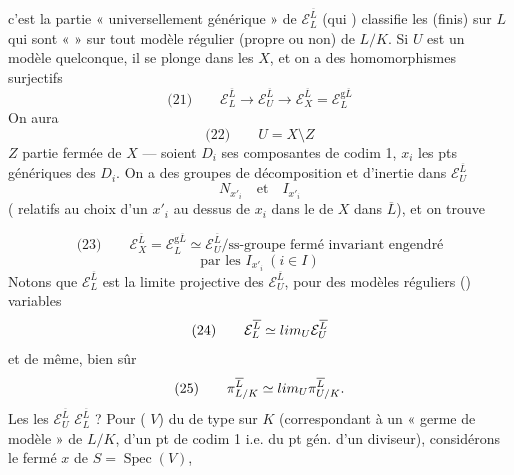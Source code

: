 \documentclass[11pt,a4paper]{article}
\begin{document}
c'est la partie « universellement générique » de
$\mathcal{E}^{\overline{L}}_{L}$  (qui \ill{} \ill{})
classifie les  (finis) \ill{} sur $L$
qui sont «  » sur tout modèle
régulier (propre ou non) de $L/K$.
Si $U$ est un modèle quelconque, il se plonge dans les $X$, et on a des homomorphismes surjectifs
\[
\text{(21)} \qquad \mathcal{E}^{\overline{L}}_{L} \longrightarrow \mathcal{E}^{\overline{L}}_{U} \longrightarrow \mathcal{E}^{\overline{L}}_{X} = \mathcal{E}^{\mathrm{g}\overline{L}}_{L}
\]
On aura \struck{\ill{}}
\[
\text{(22)} \qquad U = X \setminus Z
\]
$Z$ partie fermée de $X$ --- soient $D_i$ ses composantes de codim 1, $x_i$ les
pts génériques des $D_i$. On a des
groupes de décomposition et d'inertie dans $\mathcal{E}^{\overline{L}}_{U}$
\[
N_{x'_i} \quad \text{et} \quad I_{x'_i}
\]
( relatifs au choix d'un $x'_i$ au dessus de $x_i$ dans le  de
$X$ dans $\overline{L}$), et on trouve

\[
\text{(23)} \qquad \mathcal{E}^{\overline{L}}_{X} = \mathcal{E}^{\mathrm{g}\overline{L}}_{L} \simeq \mathcal{E}^{\overline{L}}_{U} \big/ \text{ss-groupe fermé invariant engendré}
\]
\[
\text{par les } I_{x'_i} \ (i \in I)
\]
Notons que $\mathcal{E}^{\overline{L}}_{L}$ est la limite projective des $\mathcal{E}^{\overline{L}}_{U}$, pour des
modèles réguliers () variables
\[
\text{(24)} \qquad \mathcal{E}^{\overline{L}}_{L} \simeq \varprojlim_{U} \mathcal{E}^{\overline{L}}_{U}
\]
et de même, bien sûr
\[
\text{(25)} \qquad \pi^{\overline{L}}_{L/K} \simeq \varprojlim_{U} \pi^{\overline{L}}_{U/K} .
\]
Les \ill{} \ill{} \ill{} les $\mathcal{E}^{\overline{L}}_{U}$ \ill{}
$\mathcal{E}^{\overline{L}}_{L}$ ? Pour \emph{\ill{}} (\emph{\ill{} $V$}) \ill{} du \ill{} de type
\ill{} sur $K$ (correspondant à un « germe de modèle » de $L/K$, \ill{}
 d'un pt de codim 1 i.e. du pt gén. d'un diviseur), considé\-rons
\struck{\ill{}} le \ill{} fermé $x$ de $S = \operatorname{Spec}(V)$,
\end{document}
